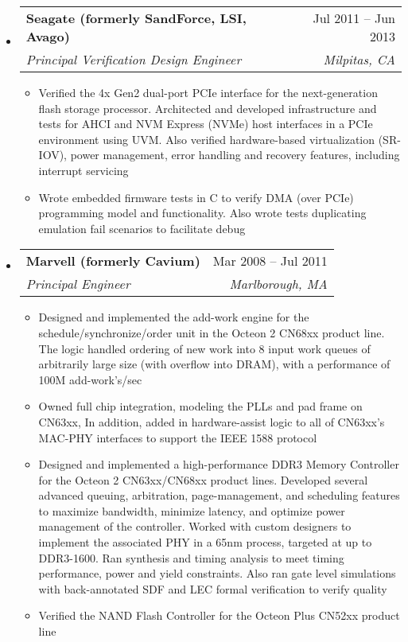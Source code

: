 \documentclass[letterpaper,12pt]{article}[leftmargin=*]
\makeatletter
\def \entryspacing {-0pt}
\newcommand{\resumeEntryStart}{\begin{itemize}[leftmargin=2.5mm]}
\newcommand{\resumeEntryEnd}{\end{itemize}\vspace{\entryspacing}}
\newcommand{\resumeItemListStart}{\begin{itemize}[leftmargin=4.5mm]}
\newcommand{\resumeItemListEnd}{\end{itemize}}
\newcommand{\resumeItem}[1]{
\item\small{
  {#1 \vspace{-2pt}}
}
}
\newcommand{\resumeEntryTSDL}[4]{
  \vspace{-1pt}\item[]
  \begin{tabularx}{0.97\textwidth}{X@{\hspace{60pt}}r}
    \textbf{\color{primary}#1} & {\firabook\color{accent}\small#2} \\
    \textit{\color{accent}\small#3} & \textit{\color{accent}\small#4} \\
  \end{tabularx}\vspace{-6pt}
}
\makeatother
\begin{document}
\resumeEntryStart
\resumeEntryTSDL
   {Seagate (formerly SandForce, LSI, Avago)}{Jul 2011 -- Jun 2013}
   {Principal Verification Design Engineer}{Milpitas, CA}
   \resumeItemListStart
   \resumeItem {Verified the 4x Gen2 dual-port PCIe interface for the next-generation flash storage processor. Architected and developed infrastructure and tests for AHCI and NVM Express (NVMe) host interfaces in a PCIe environment using UVM. Also verified hardware-based virtualization (SR-IOV), power management, error handling and recovery features, including interrupt servicing}
   \resumeItem {Wrote embedded firmware tests in C to verify DMA (over PCIe) programming model and functionality. Also wrote tests duplicating emulation fail scenarios to facilitate debug}
   \resumeItemListEnd
\resumeEntryEnd

\resumeEntryStart
\resumeEntryTSDL
   {Marvell (formerly Cavium)}{Mar 2008 -- Jul 2011}
   {Principal Engineer}{Marlborough, MA}
   \resumeItemListStart
   \resumeItem {Designed and implemented the add-work engine for the schedule/synchronize/order unit in the Octeon 2 CN68xx product line. The logic handled ordering of new work into 8 input work queues of arbitrarily large size (with overflow into DRAM), with a performance of 100M add-work’s/sec}
   \resumeItem {Owned full chip integration, modeling the PLLs and pad frame on CN63xx, In addition, added in hardware-assist logic to all of CN63xx’s MAC-PHY interfaces to support the IEEE 1588 protocol}
   \resumeItem {Designed and implemented a high-performance DDR3 Memory Controller for the Octeon 2 CN63xx/CN68xx product lines. Developed several advanced queuing, arbitration, page-management, and scheduling features to maximize bandwidth, minimize latency, and optimize power management of the controller. Worked with custom designers to implement the associated PHY in a 65nm process, targeted at up to DDR3-1600. Ran synthesis and timing analysis to meet timing performance, power and yield constraints. Also ran gate level simulations with back-annotated SDF and LEC formal verification to verify quality}
   \resumeItem {Verified the NAND Flash Controller for the Octeon Plus CN52xx product line}
   \resumeItemListEnd
\resumeEntryEnd
\end{document}
